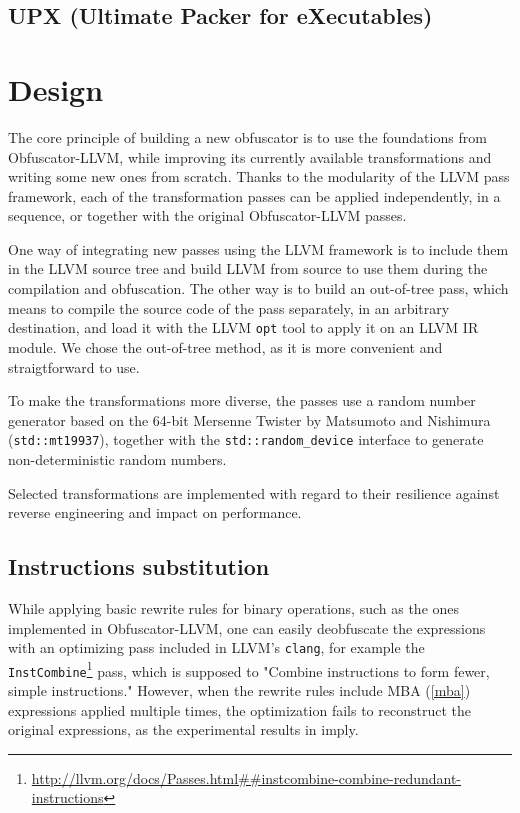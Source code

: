 \documentclass[
  digital, %
  table,   %
  twoside, %
  nolof,     %
  nolot,     %
]{fithesis3}
\theoremstyle{definition}
\begin{document}
\section{UPX (Ultimate Packer for eXecutables)}

\chapter{Design}

The core principle of building a new obfuscator is to use the foundations from Obfuscator-LLVM, while improving its currently available transformations and writing some new ones from scratch. Thanks to the modularity of the LLVM pass framework, each of the transformation passes can be applied independently, in a sequence, or together with the original Obfuscator-LLVM passes. 

One way of integrating new passes using the LLVM framework is to include them in the LLVM source tree and build LLVM from source to use them during the compilation and obfuscation. The other way is to build an out-of-tree pass, which means to compile the source code of the pass separately, in an arbitrary destination, and load it with the LLVM \texttt{opt} tool to apply it on an LLVM IR module. We chose the out-of-tree method, as it is more convenient and straigtforward to use. 

To make the transformations more diverse, the passes use a random number generator based on the 64-bit Mersenne Twister by Matsumoto and Nishimura (\texttt{std::mt19937}), together with the \texttt{std::random\_device} interface to generate non-deterministic random numbers.

Selected transformations are implemented with regard to their resilience against reverse engineering and impact on performance.

\section{Instructions substitution}
While applying basic rewrite rules for binary operations, such as the ones implemented in Obfuscator-LLVM, one can easily deobfuscate the expressions with an optimizing pass included in LLVM's \texttt{clang}, for example the \texttt{InstCombine}\footnote{\url{http://llvm.org/docs/Passes.html##instcombine-combine-redundant-instructions}} pass, which is supposed to "Combine instructions to form fewer, simple instructions." However, when the rewrite rules include MBA (\ref{mba}) expressions applied multiple times, the optimization fails to reconstruct the original expressions, as the experimental results in \cite{eyrollesMBAobf} imply. 
\end{document}
